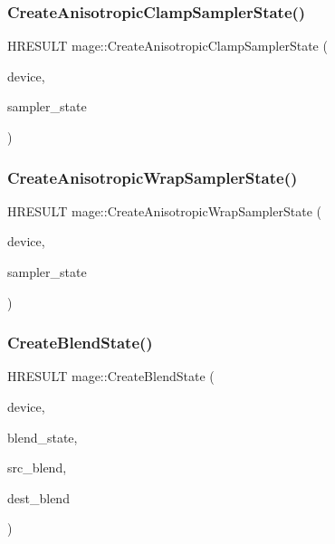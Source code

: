 \hypertarget{namespacemage_af85f5fe2b35fb8992c3eea69e87ad039}{}\label{namespacemage_af85f5fe2b35fb8992c3eea69e87ad039} 
\subsubsection{\texorpdfstring{Create\+Anisotropic\+Clamp\+Sampler\+State()}{CreateAnisotropicClampSamplerState()}}
{\footnotesize\ttfamily H\+R\+E\+S\+U\+LT mage\+::\+Create\+Anisotropic\+Clamp\+Sampler\+State (\begin{DoxyParamCaption}\item[{I\+D3\+D11\+Device2 $\ast$}]{device,  }\item[{I\+D3\+D11\+Sampler\+State $\ast$$\ast$}]{sampler\+\_\+state }\end{DoxyParamCaption})}

\hypertarget{namespacemage_a38bc123db04b8434276d3a350b5acc7f}{}\label{namespacemage_a38bc123db04b8434276d3a350b5acc7f} 
\subsubsection{\texorpdfstring{Create\+Anisotropic\+Wrap\+Sampler\+State()}{CreateAnisotropicWrapSamplerState()}}
{\footnotesize\ttfamily H\+R\+E\+S\+U\+LT mage\+::\+Create\+Anisotropic\+Wrap\+Sampler\+State (\begin{DoxyParamCaption}\item[{I\+D3\+D11\+Device2 $\ast$}]{device,  }\item[{I\+D3\+D11\+Sampler\+State $\ast$$\ast$}]{sampler\+\_\+state }\end{DoxyParamCaption})}

\hypertarget{namespacemage_ad2c838028ab44521fe1818721dd7ade1}{}\label{namespacemage_ad2c838028ab44521fe1818721dd7ade1} 
\subsubsection{\texorpdfstring{Create\+Blend\+State()}{CreateBlendState()}}
{\footnotesize\ttfamily H\+R\+E\+S\+U\+LT mage\+::\+Create\+Blend\+State (\begin{DoxyParamCaption}\item[{I\+D3\+D11\+Device2 $\ast$}]{device,  }\item[{I\+D3\+D11\+Blend\+State $\ast$$\ast$}]{blend\+\_\+state,  }\item[{D3\+D11\+\_\+\+B\+L\+E\+ND}]{src\+\_\+blend,  }\item[{D3\+D11\+\_\+\+B\+L\+E\+ND}]{dest\+\_\+blend }\end{DoxyParamCaption})}

